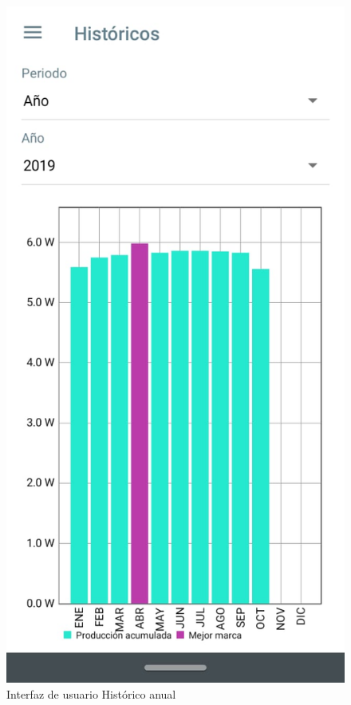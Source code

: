 \begin{figure}[H]
	\centering
	\includegraphics[scale=0.4]{Capitulo4/software/submodulos/images/man31.png}
	\caption{Interfaz de usuario Histórico anual}
	\label{fig:Historico anual}
\end{figure}

